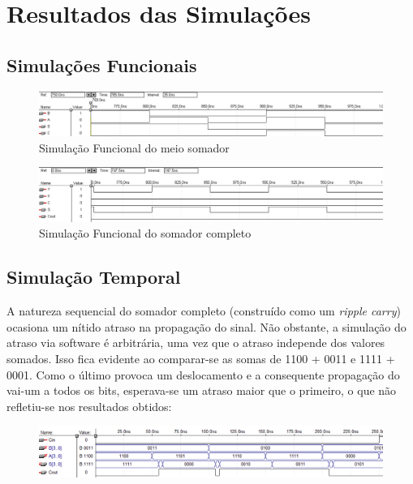 \documentclass[a4paper]{article}
\begin{document}
\FloatBarrier
\section{Resultados das Simulações}

\subsection{Simulações Funcionais}
\begin{figure}[h]
  \centering
  \includegraphics[scale=0.3]{sim_func_half_adder.png}
  \caption{Simulação Funcional do meio somador}
\end{figure}

\begin{figure}[h]
  \centering
  \includegraphics[scale=0.3]{sim_func_full_adder.png}
  \caption{Simulação Funcional do somador completo}
\end{figure}


\FloatBarrier
\subsection{Simulação Temporal}
	A natureza sequencial do somador completo (construído como um \emph{ripple
carry}) ocasiona um nítido atraso na propagação do sinal. Não obstante, a
simulação do atraso via software é arbitrária, uma vez que o atraso independe
dos valores somados. Isso fica evidente ao comparar-se as somas de 1100 + 0011
e 1111 + 0001. Como o último provoca um deslocamento e a consequente propagação
do vai-um a todos os bits, esperava-se um atraso maior que o primeiro, o que
não refletiu-se nos resultados obtidos:

\begin{figure}[h]
  \centering
  \includegraphics[scale=0.4]{sim_temp_4bit-1.png}
\end{figure}
\end{document}
